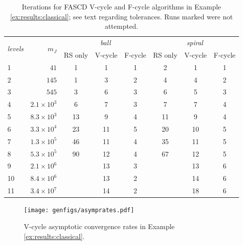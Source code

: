 \documentclass[review,hidelinks,onefignum,onetabnum]{siamart220329}
\newcommand{\XX}{\ding{55}}
\begin{document}
\begin{table}[ht]
\centering
\begin{tabular}{lr@{\hskip 7mm}cccccc}
\toprule
\multirow{2}{*}{\emph{levels}} & \multirow{2}{*}{$m_J$} & \multicolumn{3}{c}{\,\emph{ball}} & \multicolumn{3}{c}{\,\emph{spiral}} \\ \cmidrule(lr){3-5} \cmidrule(lr){6-8}
   &                  & RS only & V-cycle & F-cycle & RS only & V-cycle & F-cycle \\
\midrule
 1 &             $41$ &   1 &  1 &  1 &   2 &  1 &  1 \\
 2 &            $145$ &   1 &  3 &  2 &   4 &  4 &  2 \\
 3 &            $545$ &   3 &  6 &  3 &   6 &  5 &  3 \\
 4 & $2.1\times 10^3$ &   6 &  7 &  3 &   7 &  7 &  4 \\
 5 & $8.3\times 10^3$ &  13 &  9 &  4 &  11 &  9 &  4 \\
 6 & $3.3\times 10^4$ &  23 & 11 &  5 &  20 & 10 &  5 \\
 7 & $1.3\times 10^5$ &  46 & 11 &  4 &  35 & 11 &  5 \\
 8 & $5.3\times 10^5$ &  90 & 12 &  4 &  67 & 12 &  5 \\
 9 & $2.1\times 10^6$ & \XX & 13 &  3 & \XX & 13 &  6 \\
10 & $8.4\times 10^6$ & \XX & 13 &  2 & \XX & 14 &  6 \\
11 & $3.4\times 10^7$ & \XX & 14 &  2 & \XX & 18 &  6 \\
\bottomrule
\end{tabular}
\bigskip
\caption{Iterations for FASCD V-cycle and F-cycle algorithms in Example \ref{ex:results:classical}; see text regarding tolerances.  Runs marked \XX\xspace were not attempted.}
\label{tab:results:classical}
\end{table}

\begin{figure}[ht]
\centering
\texttt{[image: genfigs/asymprates.pdf]}
\caption{V-cycle asymptotic convergence rates in Example \ref{ex:results:classical}.}
\label{fig:results:asymp}
\end{figure}
\end{document}
